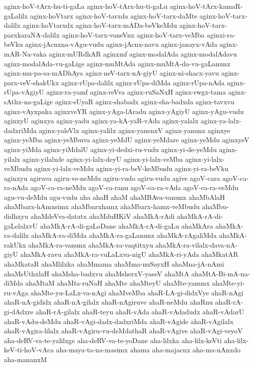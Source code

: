 {aginx-hoV-tArx-hu-ti-gaLa
aginx-hoV-tArx-hu-ti-gaLu
aginx-hoV-tArx-kamaR-gaLalilx
aginx-hoVtarx
aginx-hoV-tarxda
aginx-hoV-tarx-daMte
aginx-hoV-tarx-dalilx
aginx-hoVtarxdx
aginx-hoV-tarx-mADa-beVkeMdu
aginx-hoV-tarx-parxkaraNA-dalilx
aginx-hoV-tarx-vaneVnx
aginx-hoV-tarx-veMba
aginxi-ra-beVku
aginx-jAcnxna-vAgu-vudu
aginx-jAcnx-navu
aginx-janayx-vAda
aginx-mAR-Na-vaka
aginx-mURdhAR
aginxmf
aginx-modalAda
aginx-modalAdavu
aginx-modalAda-vu-gaLige
aginx-muMtAda
aginx-muMtA-da-vu-gaLanunx
aginx-mu-pa-sa-mADhAya
aginx-neV-tarx-nA-giyU
aginx-ni-shacx-yavu
aginx-parx-veV-shakUkx
aginx-rUpa-dalilx
aginx-rUpa-diMda
aginx-rUpa-nAda
aginx-rUpa-vAgiyU
aginx-ra-yamf
aginx-reVva
aginx-ruSaNxH
aginx-rwgx-tama
aginx-sAthx-na-gaLige
aginx-sUyaR
aginx-shabadx
aginx-sha-badxda
aginx-tavxvu
aginx-vAyxpaka
aginxveYR
aginx-yAga-lAradu
aginx-yAgiyU
aginx-yAgu-vudu
aginxyU
aginxya
aginx-yadu
aginx-ya-kA-yaR-vAda
aginx-yalalx
aginx-ya-lalx-dadxriMda
aginx-yaleVlx
aginx-yalilx
aginx-yanenxV
aginx-yanunx
aginxye
aginx-yeMba
aginx-yeMbuva
aginx-yeMdU
aginx-yeMdare
aginx-yeMdu
aginxyeV
aginx-yiMda
aginx-yiMdalU
aginx-yi-dedxi-ru-vudu
aginx-yi-de-yeMdu
aginx-yilalx
aginx-yilalxde
aginx-yi-lalx-deyU
aginx-yi-lalx-veMba
aginx-yi-lalx-veMbudu
aginx-yi-lalx-veMdu
aginx-yi-ra-beV-keMbudu
aginx-yi-ra-beVku
aginxyu
agiruva
agiru-ve-neMdu
agiru-vudo
agiru-vudu
agive
agoV-cara
agoV-ca-ra-nAda
agoV-ca-ra-neMdu
agoV-ca-ranu
agoV-ca-ra-vAda
agoV-ca-ra-veMdu
agu-vu-deMdu
agu-vudu
aha
ahaH
ahaM
ahaMBAva-vanunx
ahaMbAlaH
ahaMbarx-hAmxsimx
ahaMbarxhamx
ahaMbarx-hamx-veMbudu
ahaMbu-didhxyu
ahaMdeVva-datatx
ahaMduHKiV
ahaMkA-rAdi
ahaMkA-rA-di-gaLelalxvU
ahaMkA-rA-di-gaLoDane
ahaMkA-rA-di-gaLu
ahaMkAra
ahaMkA-ra-dalilx
ahaMkA-ra-diMda
ahaMkA-ra-gaLanunx
ahaMkA-rAgaliMda
ahaMkA-rakUkx
ahaMkA-ra-vanunx
ahaMkA-ra-vaqtitxyu
ahaMkA-ra-vilalx-dava-nA-giyU
ahaMkA-ravu
ahaMkA-ra-vuLaLxva-nigU
ahaMkA-ri-yAda
ahaMkatAR
ahaMkataR
ahaMlilxka
ahaMmama
ahaMma-nuSayxH
ahaMna-jA-nAmi
ahaMsUthxlaH
ahaMsha-badxvu
ahaMsherxV-yaseV
ahaMtA
ahaMtA-Bi-mA-na-diMda
ahaMtaM
ahaMta-ruNaH
ahaMte
ahaMteyU
ahaMte-yanunx
ahaMte-yi-ru-vAga
ahaMte-yu-LaLx-va-nAgi
ahaMveMba
ahaR-LA-gi-didxVye
ahaR-nAgi
ahaR-nA-gididx
ahaR-nA-gilalx
ahaR-nAgiruve
ahaR-neMdu
ahaRnu
ahaR-rA-gi-dAdxre
ahaR-rA-gilalx
ahaR-teyu
ahaR-vAda
ahaR-vAdadudx
ahaR-vAdarU
ahaR-vAdu-deMdu
ahaR-vAgi-dadx-dadxriMda
ahaR-vAgide
ahaR-vAgilalx
ahaR-vAgira-lilalx
ahaR-vAgiru-vu-deMdathaR
ahaR-vAgive
ahaR-vAgi-veyoV
aha-deRV-va-te-yalilxge
aha-deRV-va-te-yoDane
aha-lilxka
aha-lilx-keVti
aha-lilx-keV-ti-hoV-vAca
aha-maya-ta-na-masimx
ahama
aha-majacnx
aha-ma-nAnxdo
aha-mananxM
}
